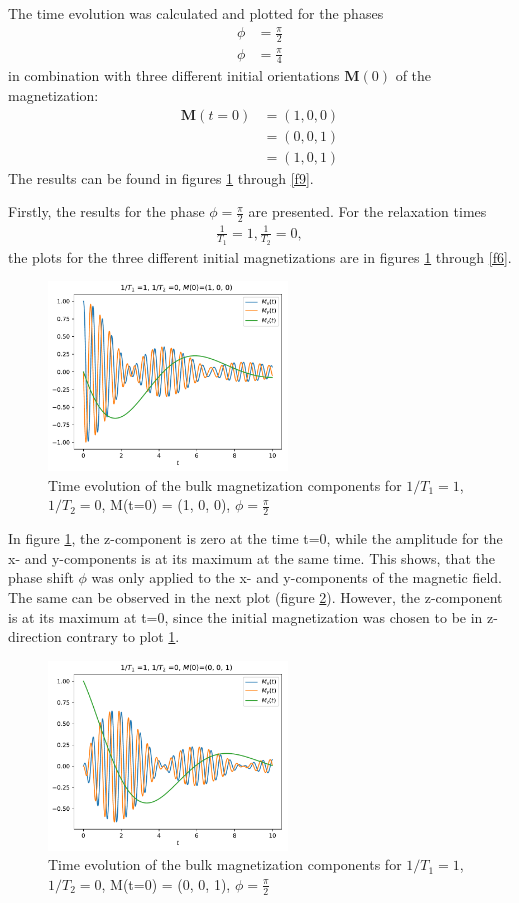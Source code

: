 \documentclass[journal]{IEEEtran} %
\begin{document}
The time evolution was calculated and plotted for the phases
\begin{align*}
    \phi &= \frac{\pi}{2} \\
    \phi &= \frac{\pi}{4}
\end{align*}
in combination with three different initial orientations $\textbf{M}(0)$ of the magnetization:
\begin{align}
    \mathbf{M}(t=0) &= (1, 0, 0) \\
                    &= (0, 0, 1) \\
                    &= (1, 0, 1)
\end{align}
The results can be found in figures \ref{f4} through \ref{f9}.

Firstly, the results for the phase \textbf{$\phi = \frac{\pi}{2}$} are presented. For the relaxation times
\begin{align}
    \frac{1}{T_1} = 1, \frac{1}{T_2} = 0,
\end{align}
the plots for the three different initial magnetizations are in figures \ref{f4} through \ref{f6}.

\begin{figure}[H]
\centering
\includegraphics[width=2.5in]{figs/NMR_T1-1_T2-0_Minit-100_tau_0.01_t_10_phase_pi_2.pdf}
\caption{Time evolution of the bulk magnetization components for $1/T_1 = 1$, $1/T_2 = 0$, M(t=0) = (1, 0, 0), $\phi = \frac{\pi}{2}$}
\label{f4}
\end{figure}
In figure \ref{f4}, the z-component is zero at the time t=0, while the amplitude for the x- and y-components is at its maximum at the same time. This shows, that the phase shift $\phi$ was only applied to the x- and y-components of the magnetic field. The same can be observed in the next plot (figure \ref{f5}). However, the z-component is at its maximum at t=0, since the initial magnetization was chosen to be in z-direction contrary to plot \ref{f4}.
\begin{figure}[H]
\centering
\includegraphics[width=2.5in]{figs/NMR_T1-1_T2-0_Minit-001_tau_0.01_t_10_phase_pi_2.pdf}
\caption{Time evolution of the bulk magnetization components for $1/T_1 = 1$, $1/T_2 = 0$, M(t=0) = (0, 0, 1), $\phi = \frac{\pi}{2}$}
\label{f5}
\end{figure}
\end{document}
